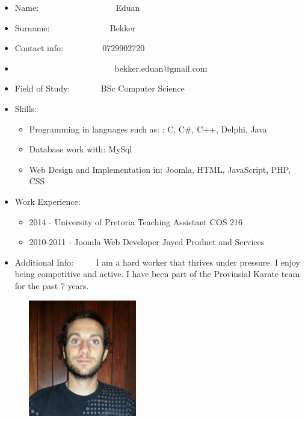 \documentclass[12pt]{article}
\begin{document}
\begin{itemize}
	\item Name: \ ~~~~~~~~~~~~~~~ \ Eduan
	\item Surname: \ ~~~~~~~~~~~ \ Bekker
	\item Contact info: \ ~~~~~~ \  0729902720
	\item \ ~~~~~~~~~~~~~~~~~~~~~ \ bekker.eduan@gmail.com
	\item Field of Study: \ ~~~~ \ BSc Computer Science
	\item Skills: \begin{itemize}
					\item Programming in languages such as: : C, C\#, C++, Delphi, Java
					\item Database work with: MySql
					\item Web Design and Implementation in: Joomla, HTML, JavaScript, PHP, CSS 
				  \end{itemize}
			\item Work Experience:
				  \begin{itemize}
							\item 2014 - University of Pretoria Teaching Assistant COS 216
							\item 2010-2011 - Joomla Web Developer Jayed Product and Services
						\end{itemize}
		\item Additional Info: \ ~~ \ I am a hard worker that thrives under pressure. I enjoy being competitive and active. I have been part of the Provinsial Karate team for the past 7 years.	
\end{itemize}


\newpage %
\begin{figure}[htbp]
	\centering
	\includegraphics[width=2in, height=2in]{./Pictures/DannyPretorius.jpg}
\end{figure}
\end{document}
